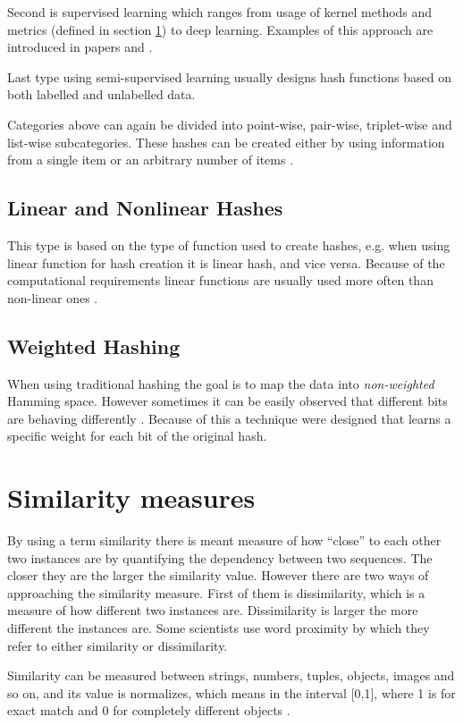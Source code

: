 Second is supervised learning which ranges from usage of kernel methods and metrics (defined in section \ref{similMeasures}) to deep learning. Examples of this approach are introduced in papers \cite{LM1} and 
\cite{LM2}.

Last type using semi-supervised learning usually designs hash functions based on both labelled and unlabelled data.

Categories above can again be divided into point-wise, pair-wise, triplet-wise and list-wise subcategories. These hashes can be created either by using information from a single item or an arbitrary number of items \cite{learnHash}.

\subsection{Linear and Nonlinear Hashes}
This type is based on the type of function used to create hashes, e.g. when using linear function for hash creation it is linear hash, and vice versa. Because of the computational requirements linear functions are usually used more often than non-linear ones \cite{learnHash}.

\subsection{Weighted Hashing}
When using traditional hashing the goal is to map the data into \textit{non-weighted} Hamming space. However sometimes it can be easily observed that different bits are behaving differently \cite{learnHash}. Because of this a technique were designed that learns a specific weight for each bit of the original hash.

\section{Similarity measures}\label{similMeasures}
By using a term similarity there is meant measure of how ``close'' to each other two instances are by quantifying the dependency between two sequences. The closer they are the larger the similarity value. However there are two ways of approaching the similarity measure. First of them is dissimilarity, which is a measure of how different two instances are. Dissimilarity is larger the more different the instances are. Some scientists use word proximity by which they refer to either similarity or dissimilarity.

Similarity can be measured between strings, numbers, tuples, objects, images and so on, and its value is normalizes, which means in the interval [0,1], where 1 is for exact match and 0 for completely different objects \cite{simDissim}.

